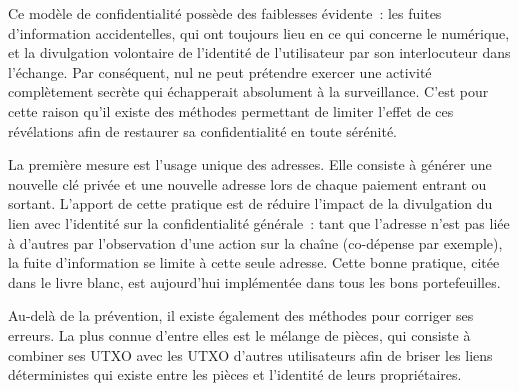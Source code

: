 Ce modèle de confidentialité possède des faiblesses évidente~: les fuites d'information accidentelles, qui ont toujours lieu en ce qui concerne le numérique, et la divulgation volontaire de l'identité de l'utilisateur par son interlocuteur dans l'échange. Par conséquent, nul ne peut prétendre exercer une activité complètement secrète qui échapperait absolument à la surveillance. C'est pour cette raison qu'il existe des méthodes permettant de limiter l'effet de ces révélations afin de restaurer sa confidentialité en toute sérénité.

La première mesure est l'usage unique des adresses. Elle consiste à générer une nouvelle clé privée et une nouvelle adresse lors de chaque paiement entrant ou sortant. L'apport de cette pratique est de réduire l'impact de la divulgation du lien avec l'identité sur la confidentialité générale~: tant que l'adresse n'est pas liée à d'autres par l'observation d'une action sur la chaîne (co-dépense par exemple), la fuite d'information se limite à cette seule adresse. Cette bonne pratique, citée dans le livre blanc, est aujourd'hui implémentée dans tous les bons portefeuilles.

Au-delà de la prévention, il existe également des méthodes pour corriger ses erreurs. La plus connue d'entre elles est le mélange de pièces, qui consiste à combiner ses UTXO avec les UTXO d'autres utilisateurs afin de briser les liens déterministes qui existe entre les pièces et l'identité de leurs propriétaires.

